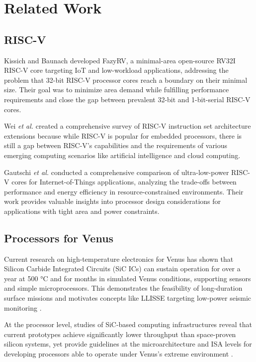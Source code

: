 \documentclass[10pt,twocolumn]{article}
\begin{document}
\section{Related Work}

\subsection{RISC-V}
Kissich and Baunach \cite{kissich2024fazyrv} developed FazyRV, a minimal-area open-source RV32I RISC-V core targeting IoT and low-workload applications, addressing the problem that 32-bit RISC-V processor cores reach a boundary on their minimal size. Their goal was to minimize area demand while fulfilling performance requirements and close the gap between prevalent 32-bit and 1-bit-serial RISC-V cores.

Wei \textit{et al.} \cite{cui2023riscv} created a comprehensive survey of RISC-V instruction set architecture extensions because while RISC-V is popular for embedded processors, there is still a gap between RISC-V's capabilities and the requirements of various emerging computing scenarios like artificial intelligence and cloud computing.

Gautschi \textit{et al.} \cite{gautschi2017slow} conducted a comprehensive comparison of ultra-low-power RISC-V cores for Internet-of-Things applications, analyzing the trade-offs between performance and energy efficiency in resource-constrained environments. Their work provides valuable insights into processor design considerations for applications with tight area and power constraints.

\subsection{Processors for Venus}
Current research on high-temperature electronics for Venus has shown that Silicon Carbide Integrated Circuits (SiC ICs) can sustain operation for over a year at 500 °C and for months in simulated Venus conditions, supporting sensors and simple microprocessors. This demonstrates the feasibility of long-duration surface missions and motivates concepts like LLISSE targeting low-power seismic monitoring \cite{kim2022sic}. 

At the processor level, studies of SiC-based computing infrastructures reveal that current prototypes achieve significantly lower throughput than space-proven silicon systems, yet provide guidelines at the microarchitecture and ISA levels for developing processors able to operate under Venus's extreme environment \cite{kremic2021temperature}.
\end{document}
